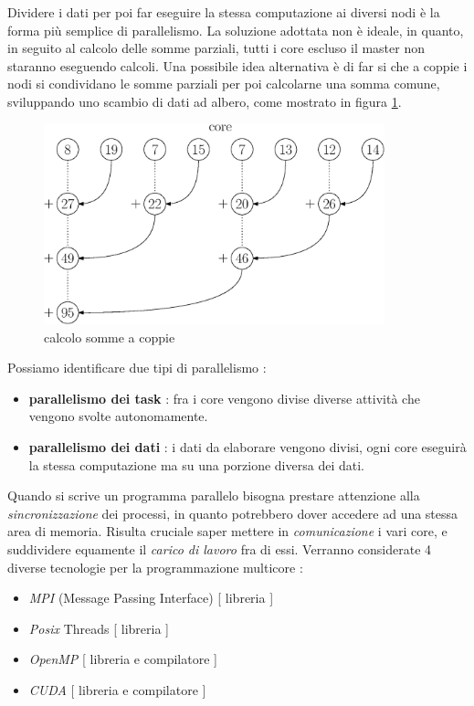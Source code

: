 \documentclass[10pt, letterpaper]{report}
\begin{document}
Dividere i dati per poi far eseguire la stessa computazione ai diversi nodi è la forma più semplice 
di parallelismo. La soluzione adottata non è ideale, in quanto, in seguito al calcolo delle somme 
parziali, tutti i core escluso il master non staranno eseguendo calcoli. Una possibile 
idea alternativa è di far si che a coppie i nodi si condividano le somme parziali per poi calcolarne 
una somma comune, sviluppando uno scambio di dati ad albero, come mostrato in figura \ref{fig:tree_cores}.
\begin{figure}[h!]
    \centering
    \includegraphics[width=280pt]{images/tree.eps}
    \caption{calcolo somme a coppie}
    \label{fig:tree_cores}
\end{figure}\acc
Possiamo identificare due tipi di parallelismo :\begin{itemize}
    \item \textbf{parallelismo dei task} : fra i core vengono divise diverse attività che vengono 
    svolte autonomamente.
    \item \textbf{parallelismo dei dati} : i dati da elaborare vengono divisi, ogni core eseguirà 
    la stessa computazione ma su una porzione diversa dei dati.
\end{itemize}
Quando si scrive un programma parallelo bisogna prestare attenzione alla \textit{sincronizzazione} dei 
processi, in quanto potrebbero dover accedere ad una stessa area di memoria. Risulta cruciale 
saper mettere in \textit{comunicazione} i vari core, e suddividere equamente il 
\textit{carico di lavoro} fra di essi. Verranno considerate 4 diverse tecnologie per la programmazione 
multicore : \begin{itemize}
    \item \textit{MPI} (Message Passing Interface) [ libreria ]
    \item \textit{Posix} Threads [ libreria ]
    \item \textit{OpenMP} [ libreria e compilatore ]
    \item \textit{CUDA} [ libreria e compilatore ]
\end{itemize}
\end{document}
